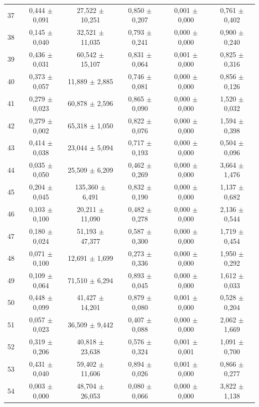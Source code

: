 \begin{tabular}{l c c c c c}
37 & 0,444 $\pm$ 0,091 & 27,522 $\pm$ 10,251 & 0,850 $\pm$ 0,207 & 0,001 $\pm$ 0,000 & 0,761 $\pm$ 0,402 \\
38 & 0,145 $\pm$ 0,040 & 32,521 $\pm$ 11,035 & 0,793 $\pm$ 0,241 & 0,000 $\pm$ 0,000 & 0,900 $\pm$ 0,240 \\
39 & 0,436 $\pm$ 0,031 & 60,542 $\pm$ 15,107 & 0,831 $\pm$ 0,064 & 0,001 $\pm$ 0,000 & 0,825 $\pm$ 0,316 \\
40 & 0,373 $\pm$ 0,057 & 11,889 $\pm$ 2,885 & 0,746 $\pm$ 0,081 & 0,000 $\pm$ 0,000 & 0,856 $\pm$ 0,126 \\
41 & 0,279 $\pm$ 0,023 & 60,878 $\pm$ 2,596 & 0,865 $\pm$ 0,090 & 0,000 $\pm$ 0,000 & 1,520 $\pm$ 0,032 \\
42 & 0,279 $\pm$ 0,002 & 65,318 $\pm$ 1,050 & 0,822 $\pm$ 0,076 & 0,000 $\pm$ 0,000 & 1,594 $\pm$ 0,398 \\
43 & 0,414 $\pm$ 0,038 & 23,044 $\pm$ 5,094 & 0,717 $\pm$ 0,193 & 0,000 $\pm$ 0,000 & 0,504 $\pm$ 0,096 \\
44 & 0,035 $\pm$ 0,050 & 25,509 $\pm$ 6,209 & 0,462 $\pm$ 0,269 & 0,000 $\pm$ 0,000 & 3,664 $\pm$ 1,476 \\
45 & 0,204 $\pm$ 0,045 & 135,360 $\pm$ 6,491 & 0,832 $\pm$ 0,190 & 0,000 $\pm$ 0,000 & 1,137 $\pm$ 0,682 \\
46 & 0,103 $\pm$ 0,100 & 20,211 $\pm$ 11,090 & 0,482 $\pm$ 0,278 & 0,000 $\pm$ 0,000 & 2,136 $\pm$ 0,544 \\
47 & 0,180 $\pm$ 0,024 & 51,193 $\pm$ 47,377 & 0,587 $\pm$ 0,300 & 0,000 $\pm$ 0,000 & 1,719 $\pm$ 0,454 \\
48 & 0,071 $\pm$ 0,100 & 12,691 $\pm$ 1,699 & 0,273 $\pm$ 0,336 & 0,000 $\pm$ 0,000 & 1,950 $\pm$ 0,292 \\
49 & 0,109 $\pm$ 0,064 & 71,510 $\pm$ 6,294 & 0,893 $\pm$ 0,045 & 0,000 $\pm$ 0,000 & 1,612 $\pm$ 0,033 \\
50 & 0,448 $\pm$ 0,099 & 41,427 $\pm$ 14,201 & 0,879 $\pm$ 0,080 & 0,001 $\pm$ 0,000 & 0,528 $\pm$ 0,204 \\
51 & 0,057 $\pm$ 0,023 & 36,509 $\pm$ 9,442 & 0,407 $\pm$ 0,088 & 0,000 $\pm$ 0,000 & 2,062 $\pm$ 1,669 \\
52 & 0,319 $\pm$ 0,206 & 40,818 $\pm$ 23,638 & 0,576 $\pm$ 0,324 & 0,001 $\pm$ 0,001 & 1,091 $\pm$ 0,700 \\
53 & 0,431 $\pm$ 0,040 & 59,402 $\pm$ 11,606 & 0,894 $\pm$ 0,026 & 0,001 $\pm$ 0,000 & 0,866 $\pm$ 0,277 \\
54 & 0,003 $\pm$ 0,000 & 48,704 $\pm$ 26,053 & 0,080 $\pm$ 0,066 & 0,000 $\pm$ 0,000 & 3,822 $\pm$ 1,138 \\

\end{tabular}
